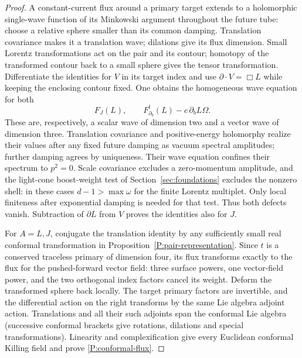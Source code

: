 \begin{proof}
A constant-current flux around a primary target extends to a
holomorphic single-wave function of its Minkowski argument throughout
the future tube: choose a relative sphere smaller than its common
damping.  Translation covariance makes it a translation wave;
dilations give its flux dimension.  Small Lorentz transformations act
on the pair and its contour; homotopy of the transformed contour back
to a small sphere gives the tensor transformation.  Differentiate the
identities for $V$ in its target index and use
$\partial\cdot V=\Box L$ while keeping the enclosing contour fixed.
One obtains the homogeneous wave equation for both
\begin{equation}
 F_J(L),\qquad
 F^t_{\partial_b}(L)-c\,\partial_bL\Omega.
 \label{P:harmonic-flux-defects}
\end{equation}
These are, respectively, a scalar wave of dimension two and a vector
wave of dimension three.  Translation covariance and positive-energy
holomorphy realize their values after any fixed future damping as
vacuum spectral amplitudes; further damping agrees by uniqueness.
Their wave equation confines their spectrum to $p^2=0$.
Scale covariance excludes a zero-momentum amplitude, and the
light-cone boost-weight test of Section~\ref{sec:foundations} excludes
the nonzero shell: in these cases $d-1>\max\omega$ for the finite
Lorentz multiplet.  Only local finiteness after exponential damping is
needed for that test.  Thus both defects vanish.  Subtraction of
$\partial L$ from $V$ proves the identities also for $J$.

For $A=L,J$, conjugate the translation identity by any sufficiently
small real conformal transformation in
Proposition~\ref{P:pair-representation}.  Since $t$ is a conserved
traceless primary of dimension four, its flux transforms exactly to
the flux for the pushed-forward vector field: three surface powers,
one vector-field power, and the two orthogonal index factors cancel
its weight.  Deform the transformed sphere back locally.  The target
primary factors are invertible, and the differential action on the
right transforms by the same Lie algebra adjoint action.  Translations
and all their such adjoints span the conformal Lie algebra (successive
conformal brackets give rotations, dilations and special
transformations).  Linearity and complexification give every
Euclidean conformal Killing field and prove
\eqref{P:conformal-flux}.
\end{proof}

